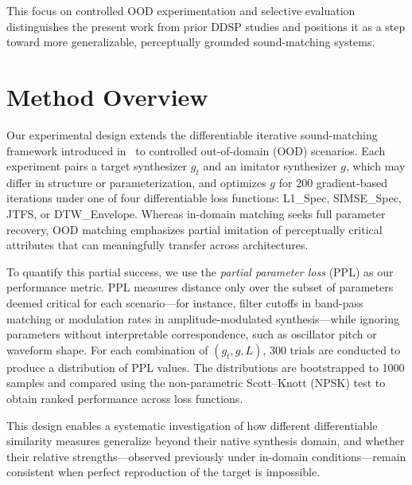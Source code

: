 \documentclass[runningheads]{llncs}
\providecommand{\gls}[1]{#1}
\begin{document}
This focus on controlled OOD experimentation and selective evaluation distinguishes the present work from prior DDSP studies and positions it as a step toward more generalizable, perceptually grounded sound-matching systems.


\section{Method Overview}
\label{sec:method_overview}

Our experimental design extends the differentiable iterative sound-matching framework introduced in~\cite{salimi2025evaluating} to controlled out-of-domain (OOD) scenarios.  
Each experiment pairs a target synthesizer $g_t$ and an imitator synthesizer $g$, which may differ in structure or parameterization, and optimizes $g$ for 200 gradient-based iterations under one of four differentiable loss functions: L1\_Spec, SIMSE\_Spec, JTFS, or DTW\_Envelope.  
Whereas in-domain matching seeks full parameter recovery, OOD matching emphasizes partial imitation of perceptually critical attributes that can meaningfully transfer across architectures.  

To quantify this partial success, we use the \textit{partial parameter loss} (PPL) as our performance metric.  
PPL measures distance only over the subset of parameters deemed critical for each scenario—for instance, filter cutoffs in band-pass matching or modulation rates in amplitude-modulated synthesis—while ignoring parameters without interpretable correspondence, such as oscillator pitch or waveform shape.  
For each combination of $(g_t, g, L)$, 300 trials are conducted to produce a distribution of PPL values.  
The distributions are bootstrapped to 1000 samples and compared using the non-parametric Scott–Knott (\gls{NPSK}) test to obtain ranked performance across loss functions.  

This design enables a systematic investigation of how different differentiable similarity measures generalize beyond their native synthesis domain, and whether their relative strengths—observed previously under in-domain conditions—remain consistent when perfect reproduction of the target is impossible.
\end{document}
